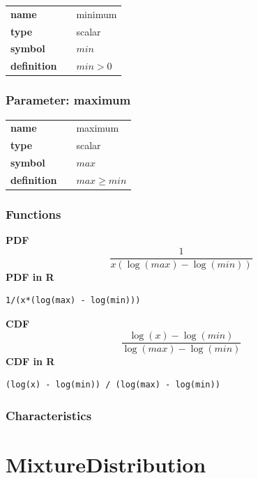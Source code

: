 \noindent\begin{tabular}{p{2cm}cl}
\textbf{name} & & minimum \\
\textbf{type} & & scalar \\
\textbf{symbol} & & $min$  \\
\textbf{definition} & & $min>0$
\end{tabular}
\subsubsection*{Parameter: maximum}

\noindent\begin{tabular}{p{2cm}cl}
\textbf{name} & & maximum \\
\textbf{type} & & scalar \\
\textbf{symbol} & & $max$  \\
\textbf{definition} & & $max \geq min$
\end{tabular}
\subsubsection*{Functions}

\smallskip \noindent \hspace{.2cm} \textbf{PDF} 
\begin{equation*}\frac{1}{x(\log(max) - \log(min))}\end{equation*}
\smallskip \noindent \hspace{.2cm} \textbf{PDF in R}  
\begin{verbatim}1/(x*(log(max) - log(min)))\end{verbatim}
\smallskip \noindent \hspace{.2cm} \textbf{CDF} 
\begin{equation*}\frac{\log(x) - \log(min)}{\log(max) - \log(min)}\end{equation*}
\smallskip \noindent \hspace{.2cm} \textbf{CDF in R} 
\begin{verbatim}(log(x) - log(min)) / (log(max) - log(min))\end{verbatim}
\smallskip
\subsubsection*{Characteristics}
\smallskip
\section*{MixtureDistribution} 

